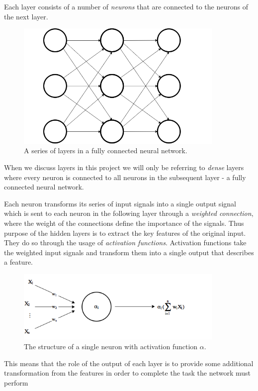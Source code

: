 \documentclass[11pt]{article}
\begin{document}
Each layer consists of a number of \textit{neurons} that are connected to the neurons of the
next layer.
\begin{figure}[!h]
    \centering
    \includegraphics[width=10cm]{include/layers.png}
    \caption{A series of layers in a fully connected neural network.}
    \label{fig:layers}
\end{figure}
When we discuss layers in this project we will only be referring to \textit{dense}
layers where every neuron is connected to all neurons in the subsequent layer - a fully
connected neural network.

Each neuron transforms its series of input signals into a single output signal which is sent to
each neuron in the following layer through a \textit{weighted connection}, where
the weight of the connections define the importance of the signals.
Thus purpose of the hidden layers is to extract the key features of the original input.
They do so through the usage of \textit{activation functions}.
Activation functions take the weighted input signals and transform them
into a single output that describes a feature.
\begin{figure}[!h]
    \centering
    \includegraphics[width=10cm]{include/neuron.png}
    \caption{The structure of a single neuron with activation function $\alpha$.}
    \label{fig:neuron}
\end{figure}

This means that the role of the output of each layer is to provide some additional
transformation from the features in order to complete the task the network
must perform\cite{DeepLearningBook}
\end{document}
